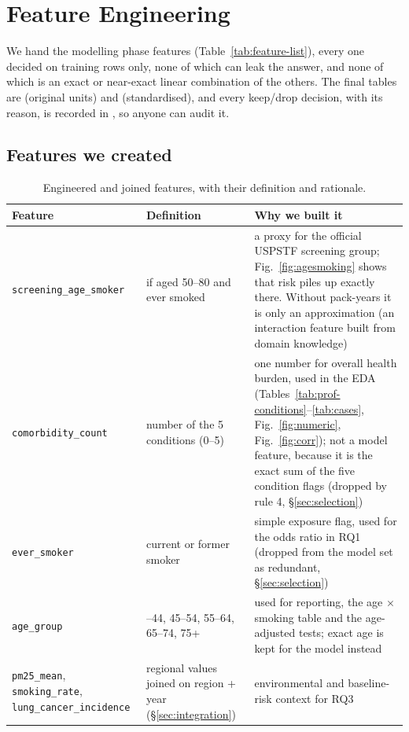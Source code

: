 \section{Feature Engineering}\label{sec:fe}

We hand the modelling phase \nFeatures features (Table~\ref{tab:feature-list}), every one decided on training rows only, none of which can leak the answer, and none of which is an exact or near-exact linear combination of the others. The final tables are  (original units) and  (standardised), and every keep/drop decision, with its reason, is recorded in , so anyone can audit it.

\subsection{Features we created}\label{sec:created}

\begin{table}[htbp]
\centering\small
\caption{Engineered and joined features, with their definition and rationale.}\label{tab:engineered}
\begin{tabularx}{\textwidth}{@{}>{\raggedright\arraybackslash}p{3.9cm} >{\raggedright\arraybackslash}p{3.7cm} >{\raggedright\arraybackslash}X@{}}
\toprule
Feature & Definition & Why we built it \\
\midrule
\texttt{screening\_age\_smoker} & 1 if aged 50--80 and ever smoked & a proxy for the official USPSTF screening group; Fig.~\ref{fig:agesmoking} shows that risk piles up exactly there. Without pack-years it is only an approximation (an interaction feature built from domain knowledge) \\
\texttt{comorbidity\_count} & number of the 5 conditions (0--5) & one number for overall health burden, used in the EDA (Tables~\ref{tab:prof-conditions}--\ref{tab:cases}, Fig.~\ref{fig:numeric}, Fig.~\ref{fig:corr}); not a model feature, because it is the exact sum of the five condition flags (dropped by rule 4, \S\ref{sec:selection}) \\
\texttt{ever\_smoker} & current or former smoker & simple exposure flag, used for the odds ratio in RQ1 (dropped from the model set as redundant, \S\ref{sec:selection}) \\
\texttt{age\_group} & 18--44, 45--54, 55--64, 65--74, 75+ & used for reporting, the age $\times$ smoking table and the age-adjusted tests; exact age is kept for the model instead \\
\texttt{pm25\_mean}, \texttt{smoking\_rate}, \texttt{lung\_cancer\_incidence} & regional values joined on region + year (\S\ref{sec:integration}) & environmental and baseline-risk context for RQ3 \\
\bottomrule
\end{tabularx}
\end{table}

